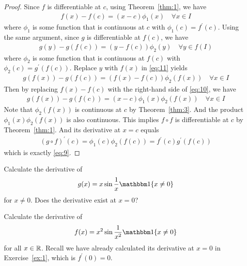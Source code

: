 \documentclass[thmcnt=section, 12pt]{my-elegantbook}
\begin{document}
\begin{proof}
    Since $f$ is differentiable at $c$, using Theorem~\ref{thm:1}, we have 
    \begin{align}
        f(x) - f(c) = (x-c) \phi_1(x)
        \quad \forall x \in I
        \label{eq:10}
    \end{align}
    where $\phi_1$ is some function that is continuous at $c$ with $\phi_1(c) = f^\prime(c)$. Using the same argument, since $g$ is differentiable at $f(c)$, we have 
    \begin{align}
        g(y) - g(f(c)) = (y-f(c)) \phi_2(y)
        \quad \forall y \in f(I)
        \label{eq:11}
    \end{align}
    where $\phi_2$ is some function that is continuous at $f(c)$ with $\phi_2(c) = g^\prime(f(c))$. Replace $y$ with $f(x)$ in \eqref{eq:11} yields 
    \begin{align*}
        g(f(x)) - g(f(c)) = (f(x)-f(c)) \phi_2(f(x))
        \quad \forall x \in I
    \end{align*}
    Then by replacing $f(x)-f(c)$ with the right-hand side of \eqref{eq:10}, we have 
    \begin{align*}
        g(f(x)) - g(f(c)) = (x-c) \phi_1(x) \phi_2(f(x))
        \quad \forall x \in I
    \end{align*}
    Note that $\phi_2(f(x))$ is continuous at $c$ by Theorem~\ref{thm:3}. And the product $\phi_1(x) \phi_2(f(x))$ is also continuous. This implies $f \circ f$ is differentiable at $c$ by Theorem~\ref{thm:1}. And its derivative at $x = c$ equals
    \begin{align*}
        (g \circ f)^\prime(c)
        = \phi_1(c) \phi_2(f(c))
        = f^\prime(c) g^\prime(f(c))
    \end{align*}
    which is exactly \eqref{eq:9}.
\end{proof}

\begin{exercise}
    Calculate the derivative of
    \begin{align*}
        g(x) = x \sin \frac{1}{x} \ind\{x \neq 0\}
    \end{align*}
    for $x \neq 0$. Does the derivative exist at $x = 0$?
    \label{ex:2}
\end{exercise}

\begin{exercise}
    Calculate the derivative of 
    \begin{align*}
        f(x) = x^2 \sin \frac{1}{x^2} \ind\{x \neq 0\}
    \end{align*}
    for all $x \in \mathbb{R}$. Recall we have already calculated its derivative at $x = 0$ in Exercise~\ref{ex:1}, which is $f^\prime(0) = 0$.

    \label{ex:3}
\end{exercise}
\end{document}
